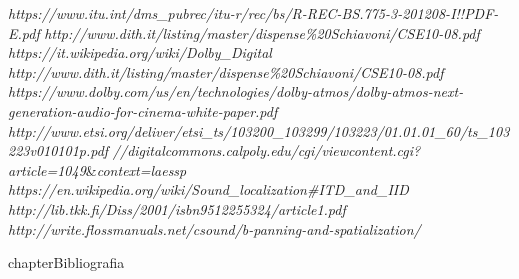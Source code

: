 \documentclass[12pt,a4paper]{report}
\begin{document}
\begin{thebibliography}{}

 \textit{https://www.itu.int/dms\_pubrec/itu-r/rec/bs/R-REC-BS.775-3-201208-I!!PDF-E.pdf}
 \textit{http://www.dith.it/listing/master/dispense\%20Schiavoni/CSE10-08.pdf}
 \textit{https://it.wikipedia.org/wiki/Dolby\_Digital}
 \textit{http://www.dith.it/listing/master/dispense\%20Schiavoni/CSE10-08.pdf}
 \textit{https://www.dolby.com/us/en/technologies/dolby-atmos/dolby-atmos-next-generation-audio-for-cinema-white-paper.pdf}
\textit{http://www.etsi.org/deliver/etsi\_ts/103200\_103299/103223/01.01.01\_60/ts\_103223v010101p.pdf}
\textit{//digitalcommons.calpoly.edu/cgi/viewcontent.cgi?article=1049}\&\textit{context=laessp}
 \textit{https://en.wikipedia.org/wiki/Sound\_localization\#ITD\_and\_IID}
 \textit{http://lib.tkk.fi/Diss/2001/isbn9512255324/article1.pdf}
 \textit{http://write.flossmanuals.net/csound/b-panning-and-spatialization/}
\end{thebibliography}

 {chapter}{Bibliografia}
\end{document}
